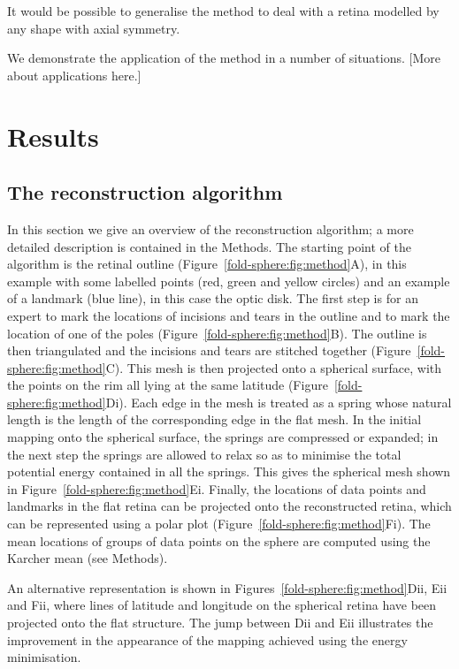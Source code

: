 \documentclass[10pt]{article}
\newcommand{\todo}[1]{{\color{red}[#1]}}
\begin{document}
It would be possible to generalise the method to deal with a retina
modelled by any shape with axial symmetry.


We demonstrate the application of the method in a number of
situations. \todo{More about applications here.}


\section*{Results}

\subsection*{The reconstruction algorithm}

In this section we give an overview of the reconstruction algorithm; a
more detailed description is contained in the Methods. The starting
point of the algorithm is the retinal outline
(Figure~\ref{fold-sphere:fig:method}A), in this example with some
labelled points (red, green and yellow circles) and an example of a
landmark (blue line), in this case the optic disk.  The first step is
for an expert to mark the locations of incisions and tears in the
outline and to mark the location of one of the poles
(Figure~\ref{fold-sphere:fig:method}B). The outline is then
triangulated and the incisions and tears are stitched together
(Figure~\ref{fold-sphere:fig:method}C). This mesh is then projected
onto a spherical surface, with the points on the rim all lying at the
same latitude (Figure~\ref{fold-sphere:fig:method}Di). Each edge in
the mesh is treated as a spring whose natural length is the length of
the corresponding edge in the flat mesh.  In the initial mapping onto
the spherical surface, the springs are compressed or expanded; in the
next step the springs are allowed to relax so as to minimise the total
potential energy contained in all the springs. This gives the
spherical mesh shown in
Figure~\ref{fold-sphere:fig:method}Ei. Finally, the locations of data
points and landmarks in the flat retina can be projected onto the
reconstructed retina, which can be represented using a polar plot
(Figure~\ref{fold-sphere:fig:method}Fi). The mean locations of groups
of data points on the sphere are computed using the Karcher mean (see
Methods).

An alternative representation is shown in
Figures~\ref{fold-sphere:fig:method}Dii, Eii and Fii, where lines of
latitude and longitude on the spherical retina have been projected
onto the flat structure. The jump between Dii and Eii illustrates the
improvement in the appearance of the mapping achieved using the energy
minimisation.
\end{document}
